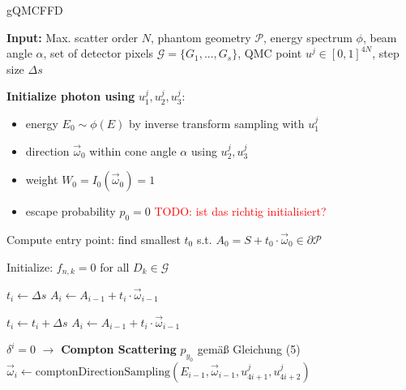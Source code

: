 \begin{algorithm}{gQMCFFD}
\caption{gQMCFFD: X-ray Scatter Simulation (Part 1)}
\label{alg:gQMCFFD}
\begin{algorithmic}[1]
\State \textbf{Input:} Max. scatter order $N$, phantom geometry $\mathcal{P}$, energy spectrum $\phi$, beam angle $\alpha$, set of detector pixels $\mathcal{G}=\{G_1, ..., G_s\}$, QMC point $u^j \in [0,1]^{4N}$, step size $\Delta s$
\vspace{.25cm}

\State \textbf{Initialize photon using } $u^j_1, u^j_2, u^j_3$:
\begin{itemize}
    \item energy $E_0 \sim \phi(E)$ by inverse transform sampling with $u^j_1$
    \item direction $\vec{\omega}_0$ within cone angle $\alpha$ using $u^j_2, u^j_3$
    \item weight $W_0 = I_0(\vec{\omega}_0) = 1$
    \item escape probability $p_0 = 0$ \textcolor{red}{TODO: ist das richtig initialisiert?}
    \end{itemize}
    \State Compute entry point: find smallest $t_0$ s.t. $A_0 = S + t_0 \cdot \vec{\omega}_0 \in \partial\mathcal{P}$

\vspace{.25cm}
\State Initialize: $f_{n,k} = 0$ for all $D_k \in \mathcal{G}$

 \State $t_i\gets\Delta s$ 
    \State$A_i \gets A_{i-1} + t_i \cdot \vec{\omega}_{i-1}$  
    
     \State $t_i \gets t_i + \Delta s$
     \State $A_i \gets A_{i-1} + t_i \cdot
    \vec{\omega}_{i-1}$  \EndWhile
    

        \State $\delta^i=0$ $\to$ \textbf{Compton Scattering}
        \State $p_{y_0}$ gemäß Gleichung (5)
        \State $\vec{\omega}_{i} \gets \text{comptonDirectionSampling}(E_{i-1}, \vec{\omega}_{i-1}, u^j_{4i+1}, u^j_{4i+2})$


\end{algorithmic}
\end{algorithm}
